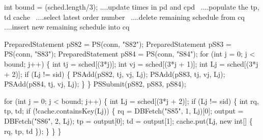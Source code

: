 \documentclass{article}
\def\nwendcode{\endtrivlist \endgroup}      %
\let\nwdocspar=\par
\theoremstyle{definition}                   %
\begin{document}
int bound = (sched.length/3);
\LA{}....update times in pd and cpd~{\nwtagstyle{}}\RA{}
\LA{}....populate the tp, td cache~{\nwtagstyle{}}\RA{}
\LA{}....select latest order number~{\nwtagstyle{}}\RA{}
\LA{}....delete remaining schedule from cq~{\nwtagstyle{}}\RA{}
\LA{}....insert new remaining schedule into cq~{\nwtagstyle{}}\RA{}
\nwendcode{}\nwdocspar
\nwenddocs{}\endmoddef{}
PreparedStatement pS82 = PS(conn, "S82");
PreparedStatement pS83 = PS(conn, "S83");
PreparedStatement pS84 = PS(conn, "S84");
for (int j = 0; j < bound; j++) \{
  int tj = sched[(3*j)];
  int vj = sched[(3*j + 1)];
  int Lj = sched[(3*j + 2)];
  if (Lj != sid) \{
    PSAdd(pS82, tj, vj, Lj);
    PSAdd(pS83, tj, vj, Lj);
    PSAdd(pS84, tj, vj, Lj);
  \}
\}
PSSubmit(pS82, pS83, pS84);
\nwendcode{}\nwdocspar
\nwenddocs{}\endmoddef{}
for (int j = 0; j < bound; j++) \{
  int Lj = sched[(3*j + 2)];
  if (Lj != sid) \{
    int rq, tp, td;
    if (!cache.containsKey(Lj)) \{
      rq = DBFetch("S85", 1, Lj)[0];
      output = DBFetch("S86", 2, Lj);
      tp = output[0];
      td = output[1];
      cache.put(Lj, new int[] \{ rq, tp, td \});
    \}
  \}
\}
\nwendcode{}\nwdocspar
\end{document}
